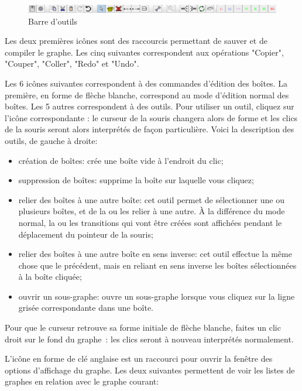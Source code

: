 \begin{figure}[!ht]
\begin{center}
\includegraphics[width=15cm]{resources/img/fig5-20.png}
\caption{Barre d'outils\label{fig-toolbar}}
\end{center}
\end{figure}

\bigskip
\noindent Les deux premières icônes sont des raccourcis permettant de sauver et de compiler le
graphe. Les cinq suivantes correspondent aux opérations "Copier", "Couper", "Coller", "Redo" et
"Undo".

\bigskip
\noindent Les 6 icônes suivantes correspondent à des commandes d’édition des boîtes. La première,
en forme de flèche blanche, correspond au mode d’édition normal des boîtes. Les 5 autres
correspondent à des outils. Pour utiliser un outil, cliquez sur l’icône correspondante : le
curseur de la souris changera alors de forme et les clics de la souris seront alors interprétés
de façon particulière. Voici la description des outils, de gauche à droite:

\begin{itemize}
  \item création de boîtes: crée une boîte vide à l’endroit du clic;
  \item suppression de boîtes: supprime la boîte sur laquelle vous cliquez;
  \item relier des boîtes à une autre boîte: cet outil permet de sélectionner une ou plusieurs
boîtes, et de la ou les relier à une autre. À la différence du mode normal, la ou les
transitions qui vont être créées sont affichées pendant le déplacement du pointeur de
la souris;
  \item relier des boîtes à une autre boîte en sens inverse: cet outil effectue la même chose que
le précédent, mais en reliant en sens inverse les boîtes sélectionnées à la boîte cliquée;
  \item ouvrir un sous-graphe: ouvre un sous-graphe lorsque vous cliquez sur la ligne grisée
correspondante dans une boîte.
\end{itemize}

\noindent Pour que le curseur retrouve sa forme initiale de flèche blanche, faites un clic droit sur le fond du graphe~:
les clics seront à nouveau interprétés normalement.

\bigskip
\noindent L'icône en forme de clé anglaise est un raccourci pour ouvrir la fenêtre des options d'affichage
du graphe. Les deux suivantes permettent de voir les listes de graphes en relation avec le
graphe courant:

